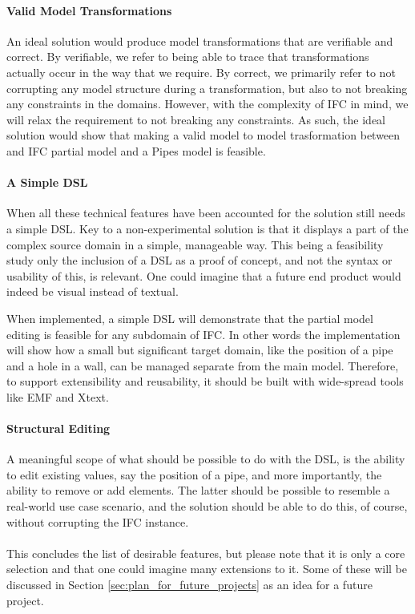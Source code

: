\paragraph{Valid Model Transformations}
An ideal solution would produce model transformations that are verifiable and correct. By verifiable, we refer to being able to trace that transformations actually occur in the way that we require. By correct, we primarily refer to not corrupting any model structure during a transformation, but also to not breaking any constraints in the domains. However, with the complexity of IFC in mind, we will relax the requirement to not breaking any constraints. As such, the ideal solution would show that making a valid model to model trasformation between and IFC partial model and a Pipes model is feasible.

\paragraph{A Simple DSL}
When all these technical features have been accounted for the solution still needs a simple DSL. Key to a non-experimental solution is that it displays a part of the complex source domain in a simple, manageable way.  This being a feasibility study only the inclusion of a DSL as a proof of concept, and not the syntax or usability of this, is relevant. One could imagine that a future end product would indeed be visual instead of textual.

When implemented, a simple DSL will demonstrate that the partial model editing is feasible for any subdomain of IFC. In other words the implementation will show how a small but significant target domain, like the position of a pipe and a hole in a wall, can be managed separate from the main model. Therefore, to support extensibility and reusability, it should be built with wide-spread tools like EMF and Xtext.

\paragraph{Structural Editing}
A meaningful scope of what should be possible to do with the DSL, is the ability to edit existing values, say the position of a pipe, and more importantly, the ability to remove or add elements. The latter should be possible to resemble a real-world use case scenario, and the solution should be able to do this, of course, without corrupting the IFC instance.
\paragraph{}
This concludes the list of desirable features, but please note that it is only a core selection and that one could imagine many extensions to it. Some of these will be discussed in Section \ref{sec:plan_for_future_projects} as an idea for a future project. 

